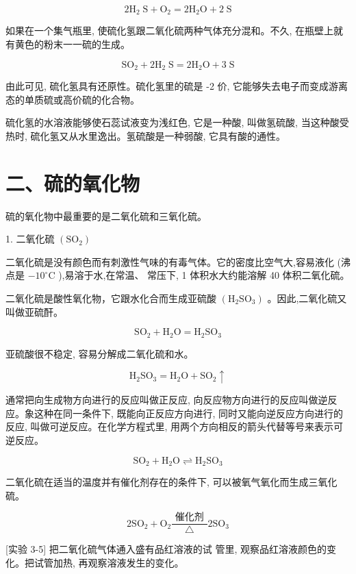 \documentclass[10pt]{article}
\begin{document}
\[
2{\mathrm{H}}_{2}\mathrm{\;S} + {\mathrm{O}}_{2} = 2{\mathrm{H}}_{2}\mathrm{O} + 2\mathrm{\;S}
\]

如果在一个集气瓶里, 使硫化氢跟二氧化硫两种气体充分混和。不久, 在瓶壁上就有黄色的粉末一一硫的生成。

\[
{\mathrm{{SO}}}_{2} + 2{\mathrm{H}}_{2}\mathrm{\;S} = 2{\mathrm{H}}_{2}\mathrm{O} + 3\mathrm{\;S}
\]

由此可见, 硫化氢具有还原性。硫化氢里的硫是 -2 价, 它能够失去电子而变成游离态的单质硫或高价硫的化合物。

硫化氢的水溶液能够使石蕊试液变为浅红色, 它是一种酸, 叫做氢硫酸, 当这种酸受热时, 硫化氢又从水里逸出。氢硫酸是一种弱酸, 它具有酸的通性。

\section*{二、硫的氧化物}

硫的氧化物中最重要的是二氧化硫和三氧化硫。

1. 二氧化硫 \(\left( {\mathrm{{SO}}}_{2}\right)\)

二氧化硫是没有颜色而有刺激性气味的有毒气体。它的密度比空气大,容易液化 (沸点是 \(- {10}^{ \circ }\mathrm{C}\) ),易溶于水,在常温、 常压下, 1 体积水大约能溶解 40 体积二氧化硫。

二氧化硫是酸性氧化物，它跟水化合而生成亚硫酸 \(\left( {{\mathrm{H}}_{2}{\mathrm{{SO}}}_{3}}\right)\) 。因此,二氧化硫又叫做亚硫酐。

\[
{\mathrm{{SO}}}_{2} + {\mathrm{H}}_{2}\mathrm{O} = {\mathrm{H}}_{2}{\mathrm{{SO}}}_{3}
\]

亚硫酸很不稳定, 容易分解成二氧化硫和水。

\[
{\mathrm{H}}_{2}{\mathrm{{SO}}}_{3} = {\mathrm{H}}_{2}\mathrm{O} + {\mathrm{{SO}}}_{2} \uparrow
\]

通常把向生成物方向进行的反应叫做正反应, 向反应物方向进行的反应叫做逆反应。象这种在同一条件下, 既能向正反应方向进行, 同时又能向逆反应方向进行的反应, 叫做可逆反应。在化学方程式里, 用两个方向相反的箭头代替等号来表示可逆反应。

\[
{\mathrm{{SO}}}_{2} + {\mathrm{H}}_{2}\mathrm{O} \rightleftharpoons {\mathrm{H}}_{2}{\mathrm{{SO}}}_{3}
\]

二氧化硫在适当的温度并有催化剂存在的条件下, 可以被氧气氧化而生成三氧化硫。

\[
2{\mathrm{{SO}}}_{2} + {\mathrm{O}}_{2}\frac{\text{ 催化剂 }}{\bigtriangleup }2{\mathrm{{SO}}}_{3}
\]

[实验 3-5] 把二氧化硫气体通入盛有品红溶液的试 管里, 观察品红溶液颜色的变化。把试管加热, 再观察溶液发生的变化。
\end{document}
